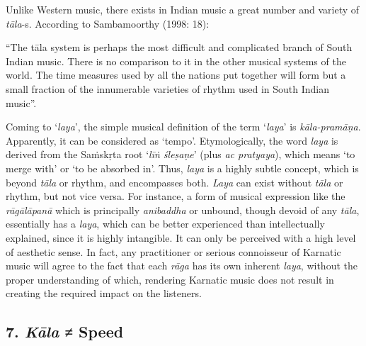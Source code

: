 Unlike Western music, there exists in Indian music a great number and variety of \textit{tāla}-s. According to Sambamoorthy (1998: 18): 

“The tāla system is perhaps the most difficult and complicated branch of South Indian music. There is no comparison to it in the other musical systems of the world. The time measures used by all the nations put together will form but a small fraction of the innumerable varieties of rhythm used in South Indian music”.

Coming to ‘\textit{laya}’, the simple musical definition of the term ‘\textit{laya}’ is \textit{kāla-pramāṇa}. Apparently, it can be considered as ‘tempo’. Etymologically, the word \textit{laya} is derived from the Saṁskṛta root ‘\textit{līṅ śleṣaṇe}’ (plus \textit{ac pratyaya}), which means ‘to merge with’ or ‘to be absorbed in’. Thus, \textit{laya} is a highly subtle concept, which is beyond \textit{tāla} or rhythm, and encompasses both. \textit{Laya} can exist without \textit{tāla} or rhythm, but not vice versa. For instance, a form of musical expression like the \textit{rāgālāpanā} which is principally \textit{anibaddha} or unbound, though devoid of any \textit{tāla}, essentially has a \textit{laya}, which can be better experienced than intellectually explained, since it is highly intangible. It can only be perceived with a high level of aesthetic sense. In fact, any practitioner or serious connoisseur of Karnatic music will agree to the fact that each \textit{rāga} has its own inherent \textit{laya}, without the proper understanding of which, rendering Karnatic music does not result in creating the required impact on the listeners.


\subsection*{7. \textit{Kāla} ≠ Speed}

